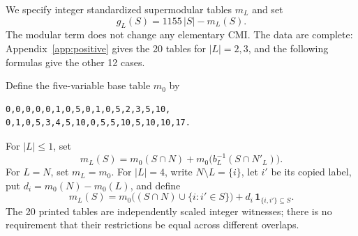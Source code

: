 \documentclass[11pt]{article}
\begin{document}
We specify integer standardized supermodular tables $m_L$ and set
\begin{equation}\label{eq:positiveh}
 g_L(S)=1155\,|S|-m_L(S).
\end{equation}
The modular term does not change any elementary CMI. The data are complete:
Appendix~\ref{app:positive} gives the 20 tables for $|L|=2,3$, and the following
formulas give the other 12 cases.

Define the five-variable base table $m_0$ by
\begin{Verbatim}[fontsize=\small]
0,0,0,0,0,1,0,5,0,1,0,5,2,3,5,10,
0,1,0,5,3,4,5,10,0,5,5,10,5,10,10,17.
\end{Verbatim}
For $|L|\le1$, set
\[
 m_L(S)=m_0(S\cap N)+m_0\bigl(b_L^{-1}(S\cap N'_L)\bigr).
\]
For $L=N$, set $m_L=m_0$. For $|L|=4$, write $N\setminus L=\{i\}$, let $i'$ be
its copied label, put $d_i=m_0(N)-m_0(L)$, and define
\[
 m_L(S)=m_0\bigl((S\cap N)\cup\{i:i'\in S\}\bigr)
       +d_i\,\mathbf1_{\{i,i'\}\subseteq S}.
\]
The 20 printed tables are independently scaled integer witnesses; there is no
requirement that their restrictions be equal across different overlaps.
\end{document}

